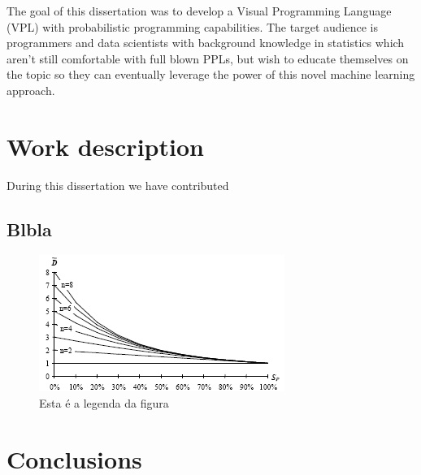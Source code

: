 \documentclass[9pt,a4paper]{extarticle}
\begin{document}
\begin{multicols}{2}
The goal of this dissertation was to develop a Visual Programming Language (VPL) with
probabilistic programming capabilities. The target audience is programmers and data scientists
with background knowledge in statistics which aren’t still comfortable with full blown PPLs, but
wish to educate themselves on the topic so they can eventually leverage the power of this novel
machine learning approach.

\section{Work description}

During this dissertation we have contributed 

\subsection{Blbla}

\begin{figure}[H]
\centerline{\includegraphics[scale=.6]{figura.png}}
\caption{Esta é a legenda da figura}
\label{fig:figura}
\end{figure}

\section{Conclusions}\label{sec:conclui}





\end{multicols}
\end{document}
